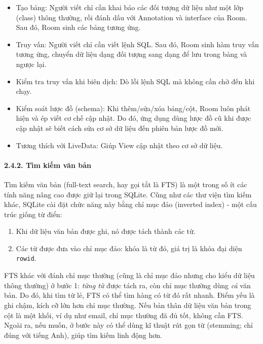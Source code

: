 \documentclass[
]{article}
\providecommand{\tightlist}{%
  \setlength{\itemsep}{0pt}\setlength{\parskip}{0pt}}
\begin{document}
\begin{itemize}
\tightlist
\item
  Tạo bảng: Người viết chỉ cần khai báo các đối tượng dữ liệu như một
  lớp (class) thông thường, rồi đánh dấu với Annotation và interface của
  Room. Sau đó, Room sinh các bảng tương ứng.
\item
  Truy vấn: Người viết chỉ cần viết lệnh SQL. Sau đó, Room sinh hàm truy
  vấn tương ứng, chuyển dữ liệu dạng đối tượng sang dạng để lưu trong
  bảng và ngược lại.
\item
  Kiểm tra truy vấn khi biên dịch: Dò lỗi lệnh SQL mà không cần chờ đến
  khi chạy.
\item
  Kiểm soát lược đồ (schema): Khi thêm/sửa/xóa bảng/cột, Room luôn phát
  hiện và ép viết cơ chế cập nhật. Do đó, ứng dụng dùng lược đồ cũ khi
  được cập nhật sẽ biết cách sửa cơ sở dữ liệu đến phiên bản lược đồ
  mới.
\item
  Tương thích với LiveData: Giúp View cập nhật theo cơ sở dữ liệu.
\end{itemize}

\hypertarget{tuxecm-kiux1ebfm-vux103n-bux1ea3n}{%
\paragraph{\texorpdfstring{2.4.2. Tìm kiếm văn bản
}{2.4.2. Tìm kiếm văn bản }}\label{tuxecm-kiux1ebfm-vux103n-bux1ea3n}}

Tìm kiếm văn bản (full-text search, hay gọi tắt là FTS) là một trong số
ít các tính năng nâng cao được giữ lại trong SQLite. Cũng như các thư
viện tìm kiếm khác, SQLite cài đặt chức năng này bằng chỉ mục đảo
(inverted index) - một cấu trúc giống từ điển:

\begin{enumerate}
\def\labelenumi{\arabic{enumi}.}
\tightlist
\item
  Khi dữ liệu văn bản được ghi, nó được tách thành các từ.
\item
  Các từ được đưa vào chỉ mục đảo: khóa là từ đó, giá trị là khóa đại
  diện \texttt{rowid}.
\end{enumerate}

FTS khác với đánh chỉ mục thường (cũng là chỉ mục đảo nhưng cho kiểu dữ
liệu thông thường) ở bước 1: \emph{từng từ} được tách ra, còn chỉ mục
thường dùng \emph{cả} văn bản. Do đó, khi tìm từ lẻ, FTS có thể tìm hàng
có từ đó rất nhanh. Điểm yếu là ghi chậm, kích cỡ lớn hơn chỉ mục
thường. Nếu bản thân dữ liệu văn bản trong cột là một khối, ví dụ như
email, chỉ mục thường đã đủ tốt, không cần FTS. Ngoài ra, nếu muốn, ở
bước này có thể dùng kĩ thuật rút gọn từ (stemming; chỉ đúng với tiếng
Anh), giúp tìm kiếm linh động hơn.
\end{document}
